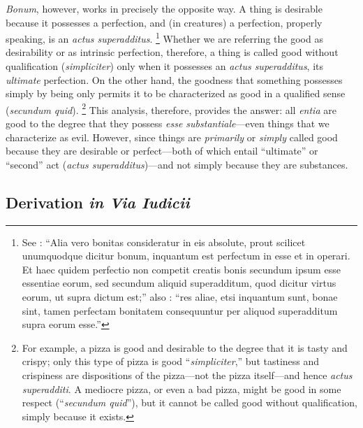 {\emph{Bonum}, however, works in precisely the opposite way. A thing is desirable because it possesses a perfection, and (in creatures) a perfection, properly speaking, is an \emph{actus superadditus}.%
%
\footnote{See \cite[lc.~4]{st:dehebdo}: ``Alia vero bonitas consideratur in eis absolute, prout scilicet unumquodque dicitur bonum, inquantum est perfectum in esse et in operari. Et haec quidem perfectio non competit creatis bonis secundum ipsum esse essentiae eorum, sed secundum aliquid superadditum, quod dicitur virtus eorum, ut supra dictum est;'' also \cite[IV, lc.~1, n.~269]{st:divnomin}: ``res aliae, etsi inquantum sunt, bonae sint, tamen perfectam bonitatem consequuntur per aliquod superadditum supra eorum esse.''}
%
Whether we are referring the good as desirability or as intrinsic perfection, therefore, a thing is called good without qualification (\emph{simpliciter}) only when it possesses an \emph{actus superadditus}, its \emph{ultimate} perfection. On the other hand, the goodness that something possesses simply by being only permits it to be characterized as good in a qualified sense (\emph{secundum quid}).%
%
\footnote{For example, a pizza is good and desirable to the degree that it is tasty and crispy; only this type of pizza is good ``\emph{simpliciter},'' but tastiness and crispiness are dispositions of the pizza---not the pizza itself---and hence \emph{actus superadditi}. A mediocre pizza, or even a bad pizza, might be good in some respect (``\emph{secundum quid}''), but it cannot be called good without qualification, simply because it exists.} This analysis, therefore, provides the answer: all \emph{entia} are good to the degree that they possess \emph{esse substantiale}---even things that we characterize as evil. However, since things are \emph{primarily} or \emph{simply} called good because they are desirable or perfect---both of which entail ``ultimate'' or ``second'' act (\emph{actus superadditus})---and not simply because they are substances.

\subsection{Derivation \emph{in Via Iudicii}}

}
